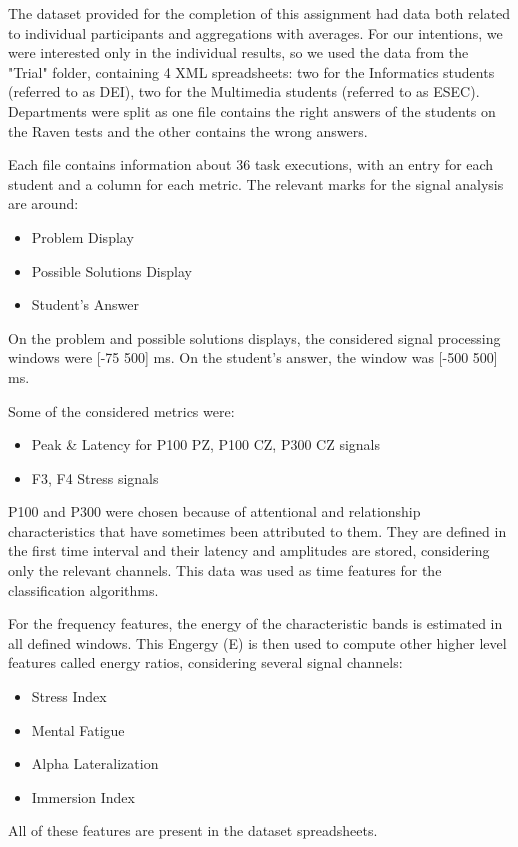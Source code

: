 \documentclass[conference]{IEEEtran}
\begin{document}
The dataset provided for the completion of this assignment had data both related 
to individual participants and aggregations with averages.
For our intentions, we were interested only in the individual results, so we used
the data from the "Trial" folder, containing 4 XML spreadsheets: two for the 
Informatics students (referred to as DEI), two for the Multimedia students 
(referred to as ESEC).
Departments were split as one file contains the right answers of the 
students on the Raven tests and the other contains the wrong answers.

Each file contains information about 36 task executions, with an entry for each 
student and a column for each metric. 
The relevant marks for the signal analysis are around: 
\begin{itemize}
\item Problem Display
\item Possible Solutions Display
\item Student's Answer
\end{itemize}
\vspace{2pt}
On the problem and possible solutions displays, the considered signal processing 
windows were [-75 500] ms.
On the student's answer, the window was [-500 500] ms.

Some of the considered metrics were:
\begin{itemize}
\item Peak \& Latency for P100 PZ, P100 CZ, P300 CZ signals
\item F3, F4 Stress signals
\end{itemize}
\vspace{2pt}
P100 and P300 were chosen because of attentional and relationship characteristics 
that have sometimes been attributed to them.
They are defined in the first time interval and their latency and amplitudes 
are stored, considering only the relevant channels.
This data was used as time features for the classification algorithms.

\newpage
For the frequency features, the energy of the characteristic bands is estimated 
in all defined windows.
This Engergy (E) is then used to compute other higher level features called 
energy ratios, considering several signal channels:
\begin{itemize}
\item Stress Index
\item Mental Fatigue
\item Alpha Lateralization
\item Immersion Index
\end{itemize}
\vspace{2pt}
All of these features are present in the dataset spreadsheets.
\end{document}
